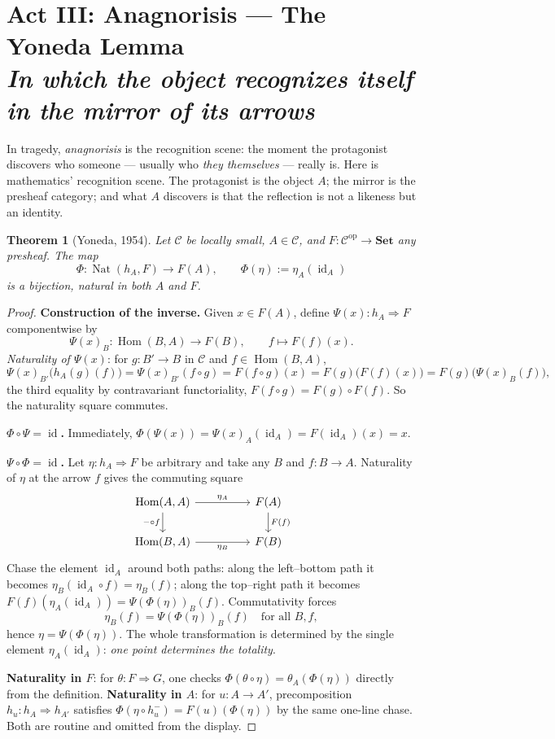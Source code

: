 \documentclass[11pt]{article}
\theoremstyle{plain}
\newtheorem{theorem}{Theorem}[section]
\theoremstyle{definition}
\theoremstyle{remark}
\newcommand{\C}{\mathcal{C}}
\newcommand{\Set}{\mathbf{Set}}
\newcommand{\Hom}{\operatorname{Hom}}
\newcommand{\Nat}{\operatorname{Nat}}
\newcommand{\id}{\operatorname{id}}
\newcommand{\op}{\mathrm{op}}
\newcommand{\act}[2]{\section{#1 \\ {\normalsize\normalfont\itshape #2}}}
\begin{document}
\act{Act III: Anagnorisis --- The Yoneda Lemma}{In which the object recognizes itself in the mirror of its arrows}

In tragedy, \emph{anagnorisis} is the recognition scene: the moment the protagonist discovers who someone --- usually who \emph{they themselves} --- really is. Here is mathematics' recognition scene. The protagonist is the object $A$; the mirror is the presheaf category; and what $A$ discovers is that the reflection is not a likeness but an identity.

\begin{theorem}[Yoneda, 1954]\label{thm:yoneda}
Let $\C$ be locally small, $A \in \C$, and $F\colon \C^{\op} \to \Set$ any presheaf. The map
\[
\Phi\colon \Nat(h_A, F) \longrightarrow F(A),
\qquad
\Phi(\eta) := \eta_A(\id_A)
\]
is a bijection, natural in both $A$ and $F$.
\end{theorem}

\begin{proof}
\textbf{Construction of the inverse.} Given $x \in F(A)$, define $\Psi(x)\colon h_A \Rightarrow F$ componentwise by
\[
\Psi(x)_B \colon \Hom(B,A) \to F(B), \qquad f \mapsto F(f)(x).
\]
\emph{Naturality of $\Psi(x)$}: for $g\colon B' \to B$ in $\C$ and $f \in \Hom(B,A)$,
\[
\Psi(x)_{B'}\bigl(h_A(g)(f)\bigr)
= \Psi(x)_{B'}(f \circ g)
= F(f \circ g)(x)
= F(g)\bigl(F(f)(x)\bigr)
= F(g)\bigl(\Psi(x)_B(f)\bigr),
\]
the third equality by contravariant functoriality, $F(f \circ g) = F(g)\circ F(f)$. So the naturality square commutes.

\textbf{$\Phi \circ \Psi = \id$.} Immediately,
$\Phi(\Psi(x)) = \Psi(x)_A(\id_A) = F(\id_A)(x) = x.$

\textbf{$\Psi \circ \Phi = \id$.} Let $\eta\colon h_A \Rightarrow F$ be arbitrary and take any $B$ and $f\colon B \to A$. Naturality of $\eta$ at the arrow $f$ gives the commuting square
\[
\begin{tikzcd}[column sep=huge]
\Hom(A,A) \arrow[r, "\eta_A"] \arrow[d, "-\circ f"'] & F(A) \arrow[d, "F(f)"] \\
\Hom(B,A) \arrow[r, "\eta_B"'] & F(B)
\end{tikzcd}
\]
Chase the element $\id_A$ around both paths: along the left--bottom path it becomes $\eta_B(\id_A \circ f) = \eta_B(f)$; along the top--right path it becomes $F(f)(\eta_A(\id_A)) = \Psi(\Phi(\eta))_B(f)$. Commutativity forces
\[
\eta_B(f) = \Psi(\Phi(\eta))_B(f) \quad\text{for all } B, f,
\]
hence $\eta = \Psi(\Phi(\eta))$. The whole transformation is determined by the single element $\eta_A(\id_A)$: \emph{one point determines the totality}.

\textbf{Naturality in $F$}: for $\theta\colon F \Rightarrow G$, one checks $\Phi(\theta \circ \eta) = \theta_A(\Phi(\eta))$ directly from the definition. \textbf{Naturality in $A$}: for $u\colon A \to A'$, precomposition $h_u\colon h_A \Rightarrow h_{A'}$ satisfies $\Phi(\eta \circ h_u^{-}) = F(u)(\Phi(\eta))$ by the same one-line chase. Both are routine and omitted from the display.
\end{proof}
\end{document}
